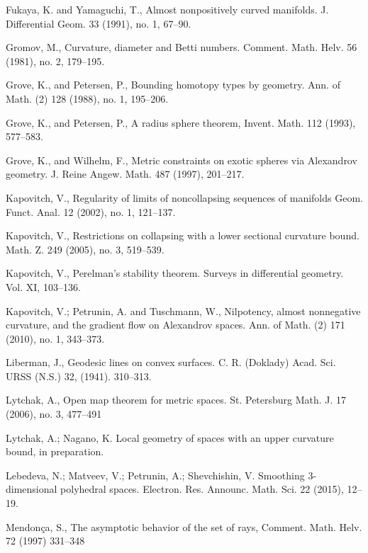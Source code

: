 \documentclass{article}
\begin{document}
\begin{thebibliography}{Bibliography}
Fukaya, K. and Yamaguchi, T., 
Almost nonpositively curved manifolds.  
J. Differential Geom.  33  (1991),  
no. 1, 67--90.

Gromov, M.,
Curvature, diameter and Betti numbers.
Comment. Math. Helv. 56 (1981), no. 2, 179--195. 

Grove, K., and Petersen, P.,
Bounding homotopy types by geometry.
Ann. of Math. (2) 128 (1988), no. 1, 195--206.

Grove, K., and Petersen, P., 
A radius sphere theorem,
Invent. Math. 112 (1993), 577--583.

Grove, K.,
and Wilhelm, F.,
Metric constraints on exotic spheres via Alexandrov geometry.  
J. Reine Angew. Math.  487  (1997), 201--217.

Kapovitch, V., Regularity of limits of noncollapsing sequences of manifolds Geom. Funct. Anal.  12  (2002),  no. 1, 121--137.

Kapovitch, V., 
Restrictions on
collapsing with a lower sectional curvature bound.  Math. Z.  249  (2005),  no.
3, 519--539.

Kapovitch, V., 
Perelman's stability theorem. 
Surveys in differential geometry. Vol. XI, 103--136.

 Kapovitch, V.; 
Petrunin, A. and 
Tuschmann, W., 
Nilpotency, almost nonnegative curvature, and the gradient flow on Alexandrov spaces. 
Ann. of Math. (2) 171 (2010), no. 1, 343--373. 

Liberman, J.,
Geodesic lines on convex surfaces.  C. R.
(Doklady) Acad. Sci. URSS (N.S.)  32,  
(1941). 
310--313.

Lytchak, A.,
Open map theorem for metric spaces.  
St. Petersburg Math. J.  17  (2006),  no. 3, 477--491 

Lytchak, A.; 
Nagano, K. 
Local geometry of  spaces with an upper curvature bound, 
in preparation.

Lebedeva, N.; 
Matveev, V.; 
Petrunin, A.; 
Shevchishin, V.
Smoothing 3-dimensional polyhedral spaces. 
Electron. Res. Announc. Math. Sci. 22 (2015), 12--19.

Mendon\c{c}a, S.,
The asymptotic behavior of the set of rays, 
Comment. Math. Helv. 72 (1997) 331--348


\end{thebibliography}
\end{document}
